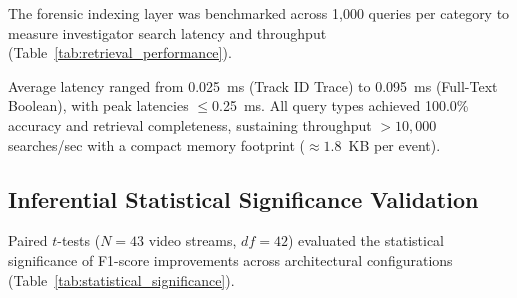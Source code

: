 \documentclass[runningheads]{llncs}
\begin{document}
The forensic indexing layer was benchmarked across 1,000 queries per category to measure investigator search latency and throughput (Table~\ref{tab:retrieval_performance}).

\begin{table}[htbp]
\centering
\caption{Forensic indexing and investigator retrieval performance.}
\label{tab:retrieval_performance}
\end{table}

Average latency ranged from 0.025~ms (Track ID Trace) to 0.095~ms (Full-Text Boolean), with peak latencies $\le$0.25~ms. All query types achieved 100.0\% accuracy and retrieval completeness, sustaining throughput $>10,000$ searches/sec with a compact memory footprint ($\approx 1.8$~KB per event).

\subsection{Inferential Statistical Significance Validation}

Paired $t$-tests ($N=43$ video streams, $df=42$) evaluated the statistical significance of F1-score improvements across architectural configurations (Table~\ref{tab:statistical_significance}).

\begin{table}[htbp]
\centering
\caption{Statistical significance of progressive architectural improvements in F1-score.}
\label{tab:statistical_significance}
\end{table}
\end{document}
